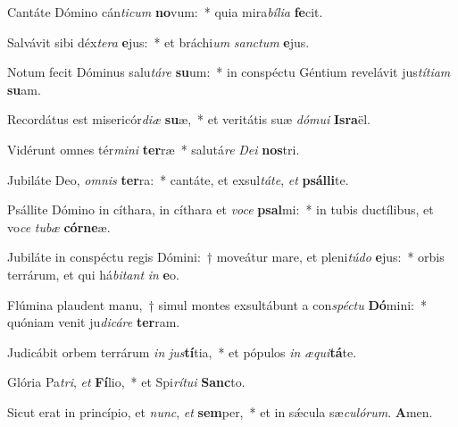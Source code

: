 \item Cantáte Dómino cán\textit{ti}\textit{cum} \textbf{no}vum:~* quia mira\textit{bí}\textit{li}\textit{a} \textbf{fe}cit.
\item Salvávit sibi déx\textit{te}\textit{ra} \textbf{e}jus:~* et bráchi\textit{um} \textit{sanc}\textit{tum} \textbf{e}jus.
\item Notum fecit Dóminus salu\textit{tá}\textit{re} \textbf{su}um:~* in conspéctu Géntium revelávit jus\textit{tí}\textit{ti}\textit{am} \textbf{su}am.
\item Recordátus est misericór\textit{di}\textit{æ} \textbf{su}æ,~* et veritátis suæ \textit{dó}\textit{mu}\textit{i} \textbf{Is}\textbf{ra}ël.
\item Vidérunt omnes tér\textit{mi}\textit{ni} \textbf{ter}ræ~* salutá\textit{re} \textit{De}\textit{i} \textbf{nos}tri.
\item Jubiláte Deo, \textit{om}\textit{nis} \textbf{ter}ra:~* cantáte, et exsul\textit{tá}\textit{te}, \textit{et} \textbf{psál}\textbf{li}te.
\item Psállite Dómino in cíthara, in cíthara et \textit{vo}\textit{ce} \textbf{psal}mi:~* in tubis ductílibus, et vo\textit{ce} \textit{tu}\textit{bæ} \textbf{cór}\textbf{ne}æ.
\item Jubiláte in conspéctu regis Dómini:~† moveátur mare, et pleni\textit{tú}\textit{do} \textbf{e}jus:~* orbis terrárum, et qui há\textit{bi}\textit{tant} \textit{in} \textbf{e}o.
\item Flúmina plaudent manu,~† simul montes exsultábunt a con\textit{spéc}\textit{tu} \textbf{Dó}mini:~* quóniam venit ju\textit{di}\textit{cá}\textit{re} \textbf{ter}ram.
\item Judicábit orbem terrárum \textit{in} \textit{jus}\textbf{tí}tia,~* et pópulos \textit{in} \textit{æ}\textit{qui}\textbf{tá}te.
\item Glória Pa\textit{tri}, \textit{et} \textbf{Fí}lio,~* et Spi\textit{rí}\textit{tu}\textit{i} \textbf{Sanc}to.
\item Sicut erat in princípio, et \textit{nunc}, \textit{et} \textbf{sem}per,~* et in sǽcula sæ\textit{cu}\textit{ló}\textit{rum}. \textbf{A}men.
